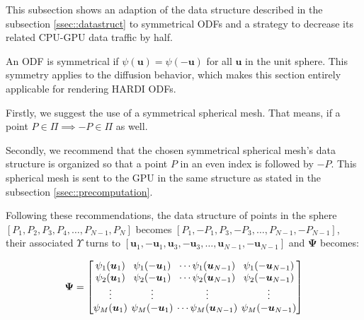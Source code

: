 \documentclass[twoside,twocolumn,10pt]{article}
\begin{document}
This subsection shows an adaption of the data structure described in the subsection \ref{ssec::datastruct} to symmetrical ODFs and a strategy to decrease its related CPU-GPU data traffic by half.

An ODF is symmetrical if $\psi(\bm{u}) = \psi(-\bm{u})$ for all $\bm{u}$ in the unit sphere. This symmetry applies to the diffusion behavior, which makes this section entirely applicable for rendering HARDI ODFs.%

Firstly, we suggest the use of a symmetrical spherical mesh. That means, if a point $P \in \Pi \implies -P \in \Pi$ as well. %

Secondly, we recommend that the chosen symmetrical spherical mesh's data structure is organized so that a point $P$ in an even index is followed by $-P$. This spherical mesh is sent to the GPU in the same structure as stated in the subsection \ref{ssec::precomputation}.


Following these recommendations, the data structure of points in the sphere $[P_1, P_2, P_3, P_4, \dots, P_{N-1}, P_N]$ becomes $[P_1, -P_1, P_3, -P_3, \dots, P_{N-1}, -P_{N-1}]$, their associated $\Upsilon$ turns to $[\bm{u}_1, -\bm{u}_1, \bm{u}_3, -\bm{u}_3, \dots, \bm{u}_{N-1}, -\bm{u}_{N-1}]$ and $\bm{\Psi}$ becomes:

\begin{equation*}
\bm{\Psi} = 
\begingroup %
\setlength\arraycolsep{2pt}
\begin{bmatrix} 
    \psi_1(\bm{u}_1) & \psi_1(-\bm{u}_1) & \cdots \psi_1(\bm{u}_{N-1}) & \psi_1(-\bm{u}_{N-1})  \\
     \psi_2(\bm{u}_1)& \psi_2(-\bm{u}_1) & \cdots \psi_2(\bm{u}_{N-1}) & \psi_2(-\bm{u}_{N-1}) \\

    \vdots & \vdots & \vdots & \vdots  \\
     \psi_M(\bm{u}_1)&\psi_M(-\bm{u}_1) & \cdots \psi_M(\bm{u}_{N-1}) & \psi_M(-\bm{u}_{N-1})
\end{bmatrix}
\endgroup
\end{equation*}
\end{document}
